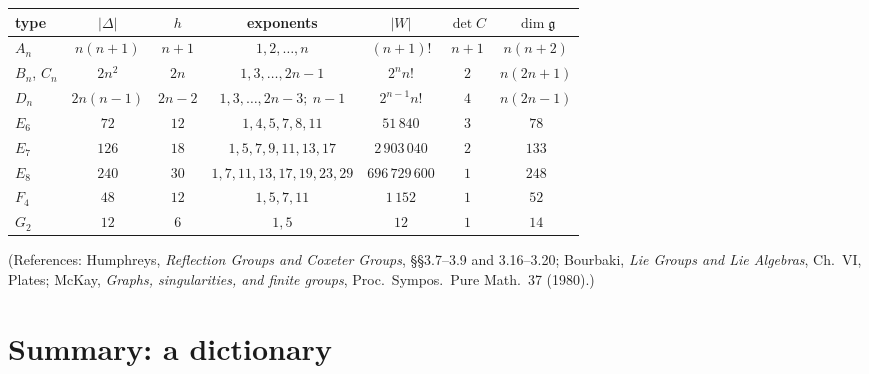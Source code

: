 \documentclass[11pt,openany]{book}
\theoremstyle{plain}
\theoremstyle{definition}
\theoremstyle{remark}
\newcommand{\abs}[1]{\left\lvert #1 \right\rvert}
\begin{document}
\begin{center}
\renewcommand{\arraystretch}{1.2}
\small
\begin{tabular}{lcccccc}
\toprule
type & $\abs{\Delta}$ & $h$ & exponents & $\abs{W}$ & $\det C$ & $\dim\mathfrak g$\\
\midrule
$A_n$ & $n(n+1)$ & $n+1$ & $1,2,\dots,n$ & $(n+1)!$ & $n+1$ & $n(n+2)$\\
$B_n$, $C_n$ & $2n^2$ & $2n$ & $1,3,\dots,2n-1$ & $2^nn!$ & $2$ & $n(2n+1)$\\
$D_n$ & $2n(n-1)$ & $2n-2$ & $1,3,\dots,2n-3;\ n-1$ & $2^{n-1}n!$ & $4$ & $n(2n-1)$\\
$E_6$ & $72$ & $12$ & $1,4,5,7,8,11$ & $51\,840$ & $3$ & $78$\\
$E_7$ & $126$ & $18$ & $1,5,7,9,11,13,17$ & $2\,903\,040$ & $2$ & $133$\\
$E_8$ & $240$ & $30$ & $1,7,11,13,17,19,23,29$ & $696\,729\,600$ & $1$ & $248$\\
$F_4$ & $48$ & $12$ & $1,5,7,11$ & $1\,152$ & $1$ & $52$\\
$G_2$ & $12$ & $6$ & $1,5$ & $12$ & $1$ & $14$\\
\bottomrule
\end{tabular}
\end{center}
(References: Humphreys, \emph{Reflection Groups and Coxeter Groups}, \S\S3.7--3.9 and 3.16--3.20; Bourbaki,
\emph{Lie Groups and Lie Algebras}, Ch.~VI, Plates; McKay, \emph{Graphs, singularities, and finite
groups}, Proc.\ Sympos.\ Pure Math.\ 37 (1980).)

\section{Summary: a dictionary}
\label{LIE:sec:dictionary}
\end{document}
